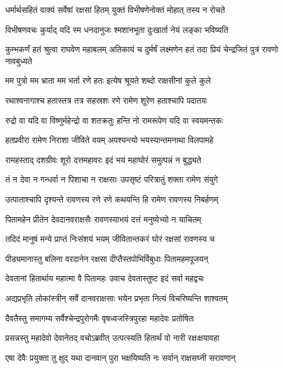 \twolineshloka
{धर्मार्थसहितं वाक्यं सर्वेषां रक्षसां हितम्}
{युक्तं विभीषणेनोक्तं मोहात् तस्य न रोचते} %

\twolineshloka
{विभीषणवचः कुर्याद् यदि स्म धनदानुजः}
{श्मशानभूता दुःखार्ता नेयं लङ्का भविष्यति} %

\threelineshloka
{कुम्भकर्णं हतं श्रुत्वा राघवेण महाबलम्}
{अतिकायं च दुर्मर्षं लक्ष्मणेन हतं तदा}
{प्रियं चेन्द्रजितं पुत्रं रावणो नावबुध्यते} %

\twolineshloka
{मम पुत्रो मम भ्राता मम भर्ता रणे हतः}
{इत्येष श्रूयते शब्दो राक्षसीनां कुले कुले} %

\twolineshloka
{रथाश्वनागाश्च हतास्तत्र तत्र सहस्रशः}
{रणे रामेण शूरेण हताश्चापि पदातयः} %

\twolineshloka
{रुद्रो वा यदि वा विष्णुर्महेन्द्रो वा शतक्रतुः}
{हन्ति नो रामरूपेण यदि वा स्वयमन्तकः} %

\twolineshloka
{हतप्रवीरा रामेण निराशा जीविते वयम्}
{अपश्यन्त्यो भयस्यान्तमनाथा विलपामहे} %

\twolineshloka
{रामहस्ताद् दशग्रीवः शूरो दत्तमहावरः}
{इदं भयं महाघोरं समुत्पन्नं न बुद्ध्यते} %

\twolineshloka
{तं न देवा न गन्धर्वा न पिशाचा न राक्षसाः}
{उपसृष्टं परित्रातुं शक्ता रामेण संयुगे} %

\twolineshloka
{उत्पाताश्चापि दृश्यन्ते रावणस्य रणे रणे}
{कथयन्ति हि रामेण रावणस्य निबर्हणम्} %

\twolineshloka
{पितामहेन प्रीतेन देवदानवराक्षसैः}
{रावणस्याभयं दत्तं मनुष्येभ्यो न याचितम्} %

\twolineshloka
{तदिदं मानुषं मन्ये प्राप्तं निःसंशयं भयम्}
{जीवितान्तकरं घोरं रक्षसां रावणस्य च} %

\twolineshloka
{पीड्यमानास्तु बलिना वरदानेन रक्षसा}
{दीप्तैस्तपोभिर्विबुधाः पितामहमपूजयन्} %

\twolineshloka
{देवतानां हितार्थाय महात्मा वै पितामहः}
{उवाच देवतास्तुष्ट इदं सर्वा महद्वचः} %

\twolineshloka
{अद्यप्रभृति लोकांस्त्रीन् सर्वे दानवराक्षसाः}
{भयेन प्रभृता नित्यं विचरिष्यन्ति शाश्वतम्} %

\twolineshloka
{दैवतैस्तु समागम्य सर्वैश्चेन्द्रपुरोगमैः}
{वृषध्वजस्त्रिपुरहा महादेवः प्रतोषितः} %

\twolineshloka
{प्रसन्नस्तु महादेवो देवानेतद् वचोऽब्रवीत्}
{उत्पत्स्यति हितार्थं वो नारी रक्षःक्षयावहा} %

\twolineshloka
{एषा देवैः प्रयुक्ता तु क्षुद् यथा दानवान् पुरा}
{भक्षयिष्यति नः सर्वान् राक्षसघ्नी सरावणान्} %

